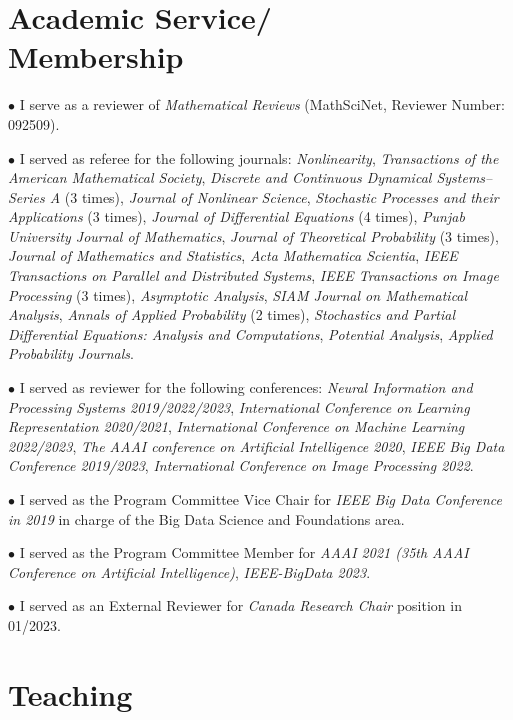 \documentclass[margin,line]{res}
\begin{document}
\begin{resume}
\section{\sc Academic Service/ \\ Membership}

$\bullet$ I serve as a reviewer of \textit{Mathematical Reviews}
(MathSciNet, Reviewer Number: 092509).

$\bullet$ I served as referee for the following journals:
\textit{Nonlinearity},
\textit{Transactions of the American Mathematical Society},
\textit{Discrete and Continuous Dynamical Systems--Series A} (3 times),
\textit{Journal of Nonlinear Science},
\textit{Stochastic Processes and their Applications} (3 times),
\textit{Journal of Differential Equations} (4 times),
\textit{Punjab University Journal of Mathematics},
\textit{Journal of Theoretical Probability} (3 times),
\textit{Journal of Mathematics and Statistics},
\textit{Acta Mathematica Scientia},
\textit{IEEE Transactions on Parallel and Distributed Systems}, 
\textit{IEEE Transactions on Image Processing} (3 times), 
\textit{Asymptotic Analysis}, 
\textit{SIAM Journal on Mathematical Analysis}, 
\textit{Annals of Applied Probability} (2 times),
\textit{Stochastics and Partial Differential Equations: Analysis and Computations},
\textit{Potential Analysis}, \textit{Applied Probability Journals}.

$\bullet$ I served as reviewer for the following conferences:
\textit{Neural Information and Processing Systems 2019/2022/2023},
\textit{International Conference on Learning Representation 2020/2021},
\textit{International Conference on Machine Learning 2022/2023},
\textit{The AAAI conference on Artificial Intelligence 2020},
\textit{IEEE Big Data Conference 2019/2023},
\textit{International Conference on Image Processing 2022}.

$\bullet$ I served as the Program Committee Vice Chair for \textit{IEEE Big Data Conference in 2019} in charge of the Big Data Science and Foundations area.

$\bullet$ I served as the Program Committee Member for \textit{AAAI 2021 (35th AAAI Conference on Artificial Intelligence)}, \textit{IEEE-BigData 2023}.

$\bullet$ I served as an External Reviewer for \textit{Canada Research Chair} position in 01/2023.



\section{\sc Teaching}


\end{resume}
\end{document}
